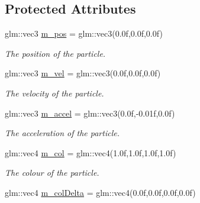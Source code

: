 \subsection*{Protected Attributes}
\begin{DoxyCompactItemize}
\item 
\hypertarget{classParticle_a5583d126be9e5a2afa87d5696af7bc2d}{glm\-::vec3 \hyperlink{classParticle_a5583d126be9e5a2afa87d5696af7bc2d}{m\-\_\-pos} = glm\-::vec3(0.\-0f,0.\-0f,0.\-0f)}\label{classParticle_a5583d126be9e5a2afa87d5696af7bc2d}

\begin{DoxyCompactList}\small\item\em The position of the particle. \end{DoxyCompactList}\item 
\hypertarget{classParticle_a36b054c5a937be8d39b5b74e7c0ccaf2}{glm\-::vec3 \hyperlink{classParticle_a36b054c5a937be8d39b5b74e7c0ccaf2}{m\-\_\-vel} = glm\-::vec3(0.\-0f,0.\-0f,0.\-0f)}\label{classParticle_a36b054c5a937be8d39b5b74e7c0ccaf2}

\begin{DoxyCompactList}\small\item\em The velocity of the particle. \end{DoxyCompactList}\item 
\hypertarget{classParticle_acb820ee6efbbc886119bd322aabdbda5}{glm\-::vec3 \hyperlink{classParticle_acb820ee6efbbc886119bd322aabdbda5}{m\-\_\-accel} = glm\-::vec3(0.\-0f,-\/0.\-01f,0.\-0f)}\label{classParticle_acb820ee6efbbc886119bd322aabdbda5}

\begin{DoxyCompactList}\small\item\em The acceleration of the particle. \end{DoxyCompactList}\item 
\hypertarget{classParticle_a43e01bd0b50f845f9066b8efb574a4a0}{glm\-::vec4 \hyperlink{classParticle_a43e01bd0b50f845f9066b8efb574a4a0}{m\-\_\-col} = glm\-::vec4(1.\-0f,1.\-0f,1.\-0f,1.\-0f)}\label{classParticle_a43e01bd0b50f845f9066b8efb574a4a0}

\begin{DoxyCompactList}\small\item\em The colour of the particle. \end{DoxyCompactList}\item 
\hypertarget{classParticle_af28eb6fe8c29593ff02e0ecbd017c1ef}{glm\-::vec4 \hyperlink{classParticle_af28eb6fe8c29593ff02e0ecbd017c1ef}{m\-\_\-col\-Delta} = glm\-::vec4(0.\-0f,0.\-0f,0.\-0f,0.\-0f)}\label{classParticle_af28eb6fe8c29593ff02e0ecbd017c1ef}


\end{DoxyCompactItemize}
